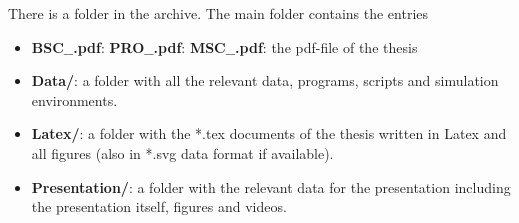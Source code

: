 \begin{appendix}
{	%
	There is a folder 
 in the archive. The main folder contains the entries
	\begin{itemize}
		\item {}
		{\textbf{BSC$\_$\NummerDerArbeit$\_$\NachnameDesStudenten.pdf}:}{}
		{\textbf{PRO$\_$\NummerDerArbeit$\_$\NachnameDesStudenten.pdf}:}{}
		{\textbf{MSC$\_$\NummerDerArbeit$\_$\NachnameDesStudenten.pdf}:}{}
		the pdf-file of the thesis
		\item \textbf{Data/}: a folder with all the relevant data, programs, scripts and simulation environments.
		\item \textbf{Latex/}: a folder with the *.tex documents of the thesis 
		written in Latex and all figures (also in *.svg data format if available).
		\item \textbf{Presentation/}: a folder with the relevant data for the presentation including the presentation itself, figures and videos.
	\end{itemize} 
}{}





\end{appendix}
